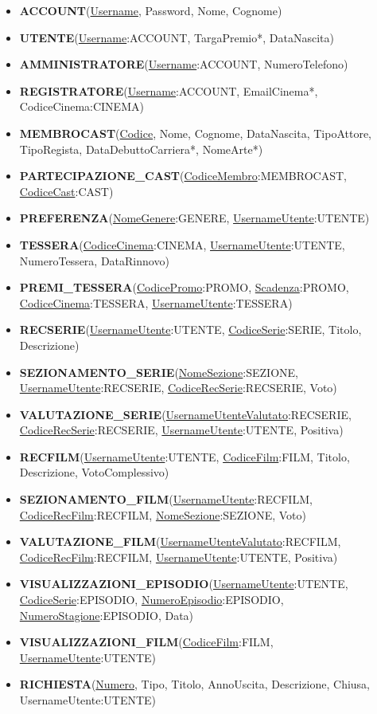 \documentclass[a4paper,12pt]{report}
\begin{document}
\begin{itemize}
	\item \textbf{ACCOUNT}(\underline{Username}, Password, Nome, Cognome)
	\item \textbf{UTENTE}(\underline{Username}:ACCOUNT, TargaPremio*, DataNascita)
	\item \textbf{AMMINISTRATORE}(\underline{Username}:ACCOUNT, NumeroTelefono)
	\item \textbf{REGISTRATORE}(\underline{Username}:ACCOUNT, EmailCinema*, CodiceCinema:CINEMA)
	
	\item \textbf{MEMBROCAST}(\underline{Codice}, Nome, Cognome, DataNascita, TipoAttore, TipoRegista, DataDebuttoCarriera*, NomeArte*)
	\item \textbf{PARTECIPAZIONE{\_}CAST}(\underline{CodiceMembro}:MEMBROCAST, \underline{CodiceCast}:CAST)
	
	\item \textbf{PREFERENZA}(\underline{NomeGenere}:GENERE, \underline{UsernameUtente}:UTENTE)
	
	\item \textbf{TESSERA}(\underline{CodiceCinema}:CINEMA, \underline{UsernameUtente}:UTENTE, NumeroTessera, DataRinnovo)
	\item \textbf{PREMI{\_}TESSERA}(\underline{CodicePromo}:PROMO, \underline{Scadenza}:PROMO, \underline{CodiceCinema}:TESSERA, \underline{UsernameUtente}:TESSERA)
	
	\item \textbf{RECSERIE}(\underline{UsernameUtente}:UTENTE, \underline{CodiceSerie}:SERIE, Titolo, Descrizione)
	\item \textbf{SEZIONAMENTO{\_}SERIE}(\underline{NomeSezione}:SEZIONE, \underline{UsernameUtente}:RECSERIE, \underline{CodiceRecSerie}:RECSERIE, Voto)
	\item \textbf{VALUTAZIONE{\_}SERIE}(\underline{UsernameUtenteValutato}:RECSERIE, \underline{CodiceRecSerie}:RECSERIE, \underline{UsernameUtente}:UTENTE, Positiva)
	
	\item \textbf{RECFILM}(\underline{UsernameUtente}:UTENTE, \underline{CodiceFilm}:FILM, Titolo, Descrizione, VotoComplessivo)
	\item \textbf{SEZIONAMENTO{\_}FILM}(\underline{UsernameUtente}:RECFILM, \underline{CodiceRecFilm}:RECFILM, \underline{NomeSezione}:SEZIONE, Voto)
	\item \textbf{VALUTAZIONE{\_}FILM}(\underline{UsernameUtenteValutato}:RECFILM, \underline{CodiceRecFilm}:RECFILM, \underline{UsernameUtente}:UTENTE, Positiva)
	
	\item \textbf{VISUALIZZAZIONI{\_}EPISODIO}(\underline{UsernameUtente}:UTENTE, \underline{CodiceSerie}:EPISODIO, \underline{NumeroEpisodio}:EPISODIO, \underline{NumeroStagione}:EPISODIO, Data)
	\item \textbf{VISUALIZZAZIONI{\_}FILM}(\underline{CodiceFilm}:FILM, \underline{UsernameUtente}:UTENTE)
	
	\item \textbf{RICHIESTA}(\underline{Numero}, Tipo, Titolo, AnnoUscita, Descrizione, Chiusa, UsernameUtente:UTENTE)
\end{itemize}
\end{document}
